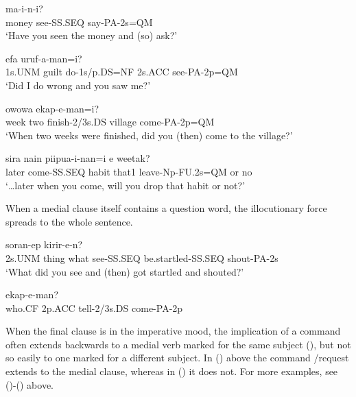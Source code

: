 \ea%
\label{ex:x1899}
  ma-i-n-i? \\
money  see-SS.SEQ  say-PA-2s=QM\\
\glt `Have you seen the money and (so) ask?'
\z

\ea%
\label{ex:x1900}
\gll [Yo  pina  on-amkun=ko]  efa  uruf-a-man=i?\\
1s.UNM  guilt  do-1s/p.DS=NF  2s.ACC  see-PA-2p=QM\\
\glt `Did I do wrong and you saw me?'
\z

\ea%
\label{ex:x1901}
  owowa  ekap-e-man=i? \\
week  two  finish-2/3s.DS  village  come-PA-2p=QM\\
\glt `When two weeks were finished, did you (then) come to the village?'
\z

\ea%
\label{ex:x1902}
  sira  nain  piipua-i-nan=i  e  weetak? \\
later  come-SS.SEQ  habit  that1  leave-Np-FU.2s=QM  or  no\\
\glt `{\dots}later when you come, will you drop that habit or not?'
\z


When a medial clause itself contains a question word, the illocutionary force spreads to the whole sentence. 

\ea%
\label{ex:x1363}
  soran-ep  kirir-e-n?\\
2s.UNM  thing  what  see-SS.SEQ  be.startled-SS.SEQ  shout-PA-2s\\
\glt `What did you see and (then) got startled and shouted?'
\z

\ea%
\label{ex:x1903}
  ekap-e-man? \\
who.CF  2p.ACC  tell-2/3s.DS  come-PA-2p\\
\glt 
\z




When the final clause is in the imperative mood, the implication of a command often extends backwards to a medial verb marked for the same subject (), but not so easily to one marked for a different subject. In () above the command /request extends to the medial clause, whereas in () it does not. For more examples, see ()-() above.

